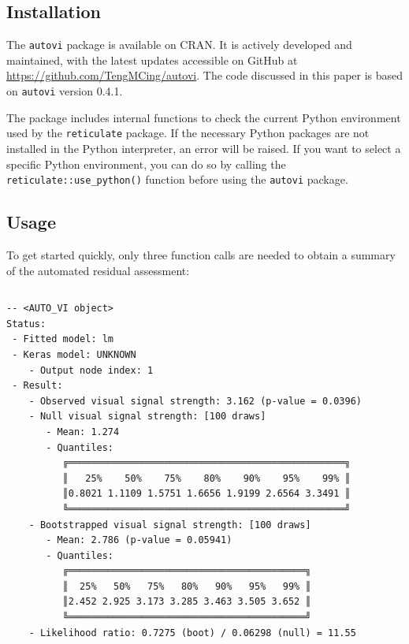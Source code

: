 \documentclass[
doublespace,
  times]{anzsauth}
\newenvironment{Shaded}{\begin{snugshade}}{\end{snugshade}}
\newcommand{\AttributeTok}[1]{\textcolor[rgb]{0.40,0.45,0.13}{#1}}
\newcommand{\FunctionTok}[1]{\textcolor[rgb]{0.28,0.35,0.67}{#1}}
\newcommand{\NormalTok}[1]{\textcolor[rgb]{0.00,0.23,0.31}{#1}}
\newcommand{\OtherTok}[1]{\textcolor[rgb]{0.00,0.23,0.31}{#1}}
\newcommand{\SpecialCharTok}[1]{\textcolor[rgb]{0.37,0.37,0.37}{#1}}
\begin{document}
\subsection{Installation}\label{installation}

The \texttt{autovi} package is available on CRAN. It is actively
developed and maintained, with the latest updates accessible on GitHub
at \url{https://github.com/TengMCing/autovi}. The code discussed in this
paper is based on \texttt{autovi} version 0.4.1.

The package includes internal functions to check the current Python
environment used by the \texttt{reticulate} package. If the necessary
Python packages are not installed in the Python interpreter, an error
will be raised. If you want to select a specific Python environment, you
can do so by calling the \texttt{reticulate::use\_python()} function
before using the \texttt{autovi} package.

\subsection{Usage}\label{sec-autovi-usage}

To get started quickly, only three function calls are needed to obtain a
summary of the automated residual assessment:

\begin{Shaded}
\end{Shaded}

\begin{verbatim}
\end{verbatim}

\begin{verbatim}
-- <AUTO_VI object>
Status:
 - Fitted model: lm
 - Keras model: UNKNOWN
    - Output node index: 1
 - Result:
    - Observed visual signal strength: 3.162 (p-value = 0.0396)
    - Null visual signal strength: [100 draws]
       - Mean: 1.274
       - Quantiles: 
          ╔═════════════════════════════════════════════════╗
          ║   25%    50%    75%    80%    90%    95%    99% ║
          ║0.8021 1.1109 1.5751 1.6656 1.9199 2.6564 3.3491 ║
          ╚═════════════════════════════════════════════════╝
    - Bootstrapped visual signal strength: [100 draws]
       - Mean: 2.786 (p-value = 0.05941)
       - Quantiles: 
          ╔══════════════════════════════════════════╗
          ║  25%   50%   75%   80%   90%   95%   99% ║
          ║2.452 2.925 3.173 3.285 3.463 3.505 3.652 ║
          ╚══════════════════════════════════════════╝
    - Likelihood ratio: 0.7275 (boot) / 0.06298 (null) = 11.55 
\end{verbatim}
\end{document}
